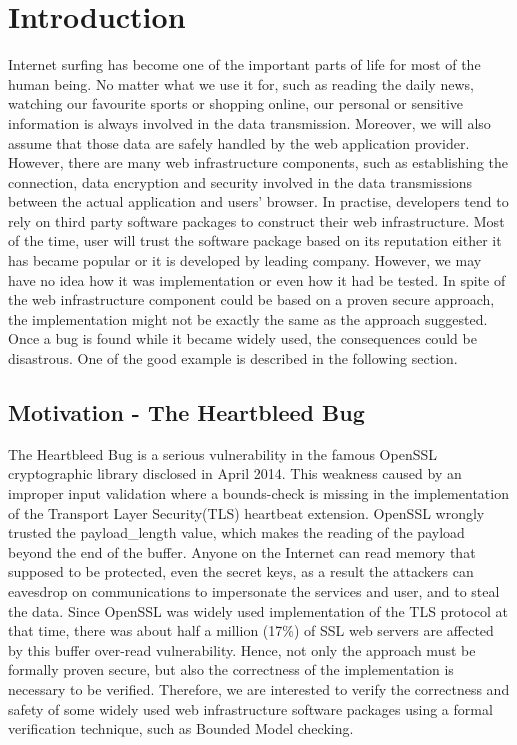 \chapter{Introduction}
Internet surfing has become one of the important parts of life for most of the human being. No matter what we use it for, such as reading the daily news, watching our favourite sports or shopping online, our personal or sensitive information is always involved in the data transmission. Moreover, we will also assume that those data are safely handled by the web application provider. However, there are many web infrastructure components, such as establishing the connection, data encryption and security involved in the data transmissions between the actual application and users' browser. In practise, developers tend to rely on third party software packages to construct their web infrastructure. Most of the time, user will trust the software package based on its reputation either it has became popular or it is developed by leading company. However, we may have no idea how it was implementation or even how it had be tested. In spite of the web infrastructure component could be based on a proven secure approach, the implementation might not be exactly the same as the approach suggested. Once a bug is found while it became widely used, the consequences could be disastrous. One of the good example is described in the following section.

\section{Motivation - The Heartbleed Bug}
The Heartbleed Bug is a serious vulnerability in the famous OpenSSL cryptographic library disclosed in April 2014. This weakness caused by an improper input validation where a bounds-check is missing in the implementation of the Transport Layer Security(TLS) heartbeat extension. OpenSSL wrongly trusted the payload\string_length value, which makes the reading of the payload beyond the end of the buffer. Anyone on the Internet can read memory that supposed to be protected, even the secret keys, as a result the attackers can eavesdrop on communications to impersonate the services and user, and to steal the data. Since OpenSSL was widely used implementation of the TLS protocol at that time, there was about half a million (17\%) of SSL web servers are affected \cite{9_heartbleed} by this buffer over-read vulnerability. Hence, not only the approach must be formally proven secure, but also the correctness of the implementation is necessary to be verified. Therefore, we are interested to verify the correctness and safety of some widely used web infrastructure software packages using a formal verification technique, such as Bounded Model checking.

